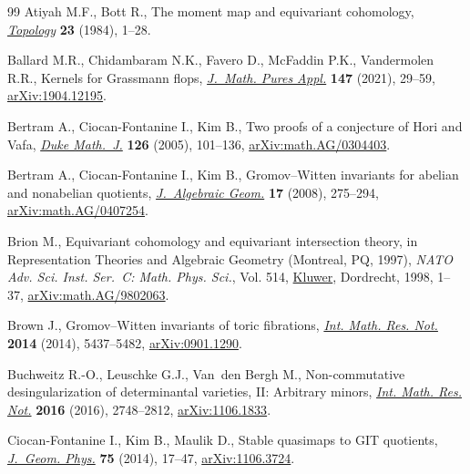 \documentclass[11pt]{article}
\numberwithin{equation}{section}
\numberwithin{equation}{section}
\begin{document}
\begin{thebibliography}{99}
Atiyah M.F., Bott R., The moment map and equivariant cohomology,
 \href{https://doi.org/10.1016/0040-9383(84)90021-1}{\textit{Topology}} \textbf{23} (1984), 1--28.

Ballard M.R., Chidambaram N.K., Favero D., McFaddin P.K., Vandermolen R.R.,
 Kernels for {G}rassmann flops, \href{https://doi.org/10.1016/j.matpur.2021.01.005}{\textit{J.~Math. Pures Appl.}} \textbf{147}
 (2021), 29--59, \href{https://arxiv.org/abs/1904.12195}{arXiv:1904.12195}.

Bertram A., Ciocan-Fontanine I., Kim B., Two proofs of a conjecture of {H}ori
 and {V}afa, \href{https://doi.org/10.1215/S0012-7094-04-12613-2}{\textit{Duke Math.~J.}} \textbf{126} (2005), 101--136,
 \href{https://arxiv.org/abs/math.AG/0304403}{arXiv:math.AG/0304403}.

Bertram A., Ciocan-Fontanine I., Kim B., Gromov--{W}itten invariants for
 abelian and nonabelian quotients, \href{https://doi.org/10.1090/S1056-3911-07-00456-0}{\textit{J.~Algebraic Geom.}} \textbf{17}
 (2008), 275--294, \href{https://arxiv.org/abs/math.AG/0407254}{arXiv:math.AG/0407254}.

Brion M., Equivariant cohomology and equivariant intersection theory, in
 Representation Theories and Algebraic Geometry ({M}ontreal, {PQ}, 1997),
 \textit{NATO Adv. Sci. Inst. Ser.~C: Math. Phys. Sci.}, Vol. 514, \href{https://doi.org/10.1007/978-94-015-9131-7_1}{Kluwer},
 Dordrecht, 1998, 1--37, \href{https://arxiv.org/abs/math.AG/9802063}{arXiv:math.AG/9802063}.

Brown J., Gromov--{W}itten invariants of toric fibrations, \href{https://doi.org/10.1093/imrn/rnt030}{\textit{Int. Math.
 Res. Not.}} \textbf{2014} (2014), 5437--5482, \href{https://arxiv.org/abs/0901.1290}{arXiv:0901.1290}.

Buchweitz R.-O., Leuschke G.J., Van~den Bergh M., Non-commutative
 desingularization of determinantal varieties, {II}: {A}rbitrary minors,
 \href{https://doi.org/10.1093/imrn/rnv207}{\textit{Int. Math. Res. Not.}} \textbf{2016} (2016), 2748--2812,
 \href{https://arxiv.org/abs/1106.1833}{arXiv:1106.1833}.

Ciocan-Fontanine I., Kim B., Maulik D., Stable quasimaps to {GIT} quotients,
 \href{https://doi.org/10.1016/j.geomphys.2013.08.019}{\textit{J.~Geom. Phys.}} \textbf{75} (2014), 17--47, \href{https://arxiv.org/abs/1106.3724}{arXiv:1106.3724}.


\end{thebibliography}
\end{document}

